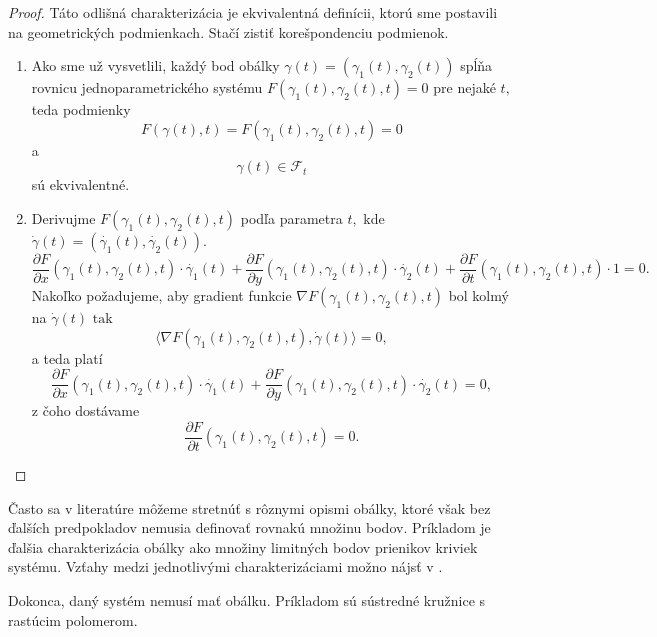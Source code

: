 \begin{proof}
Táto odlišná charakterizácia je ekvivalentná definícii, ktorú sme postavili na geometrických podmienkach. Stačí zistiť korešpondenciu podmienok.
\begin{enumerate}
\item Ako sme už vysvetlili, každý bod obálky ${\gamma}(t) = (\gamma_{1}(t),\gamma_{2}(t))$ spĺňa rovnicu jednoparametrického systému $F(\gamma_{1}(t),\gamma_{2}(t),t)=0$ pre nejaké $t,$ teda podmienky 
$$ F(\gamma(t), t) = F(\gamma_{1}(t), \gamma_{2}(t), t) = 0$$
a
$$\gamma(t) \in \mathcal{F}_{t}$$
sú ekvivalentné.
\item Derivujme $F(\gamma_{1}(t),\gamma_{2}(t), t)$ podľa parametra $t,$ kde $ \dot{\gamma}(t) = ( \dot{\gamma_{1}}(t), \dot{\gamma_{2}}(t) ).$
$$ \frac{\partial F}{\partial x}(\gamma_{1}(t),\gamma_{2}(t),t) \cdot \dot{\gamma_{1}}(t)+\frac{\partial F}{\partial y}(\gamma_{1}(t),\gamma_{2}(t),t) \cdot \dot{\gamma_{2}}(t)+\frac{\partial F}{\partial t}(\gamma_{1}(t),\gamma_{2}(t),t) \cdot 1 = 0. $$
Nakoľko požadujeme, aby gradient funkcie $\nabla F(\gamma_{1}(t),\gamma_{2}(t),t)$ bol kolmý na $\dot{\gamma}(t) \text{ tak}$
$$ \langle \nabla F(\gamma_{1}(t),\gamma_{2}(t),t), \dot{\gamma}(t) \rangle = 0,$$
a teda platí
$$ \frac{\partial F}{\partial x}(\gamma_{1}(t),\gamma_{2}(t),t) \cdot \dot{\gamma_{1}}(t)+\frac{\partial F}{\partial y}(\gamma_{1}(t),\gamma_{2}(t),t) \cdot \dot{\gamma_{2}}(t) = 0, $$
z čoho dostávame
$$ \frac{\partial F}{\partial t}(\gamma_{1}(t),\gamma_{2}(t),t) = 0. $$ 
\end{enumerate}
\end{proof}


Často sa v literatúre môžeme stretnúť s rôznymi opismi obálky, ktoré však bez ďalších predpokladov nemusia definovať rovnakú množinu bodov. Príkladom je ďalšia charakterizácia obálky ako množiny limitných bodov prienikov kriviek systému. Vzťahy medzi jednotlivými charakterizáciami možno nájsť v \cite{Bru81}.  

Dokonca, daný systém nemusí mať obálku. Príkladom sú sústredné kružnice s rastúcim polomerom.

